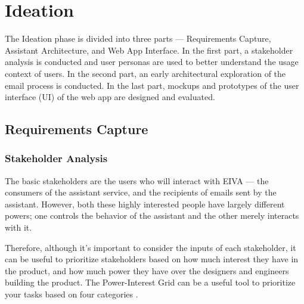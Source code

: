 \documentclass{article}
\begin{document}
\newpage

\section{Ideation}

The Ideation phase is divided into three parts --- Requirements Capture, Assistant Architecture, and Web App Interface. In the first part, a stakeholder analysis is conducted and user personas are used to better understand the usage context of users. In the second part, an early architectural exploration of the email process is conducted. In the last part, mockups and prototypes of the user interface (UI) of the web app are designed and evaluated.

\subsection{Requirements Capture}

\subsubsection{Stakeholder Analysis}

The basic stakeholders are the users who will interact with EIVA --- the consumers of the assistant service, and the recipients of emails sent by the assistant. However, both these highly interested people have largely different powers; one controls the behavior of the assistant and the other merely interacts with it.

Therefore, although it's important to consider the inputs of each stakeholder, it can be useful to prioritize stakeholders based on how much interest they have in the product, and how much power they have over the designers and engineers building the product. The Power-Interest Grid can be a useful tool to prioritize your tasks based on four categories \cite{noauthor_stakeholder_nodate}.
\end{document}
